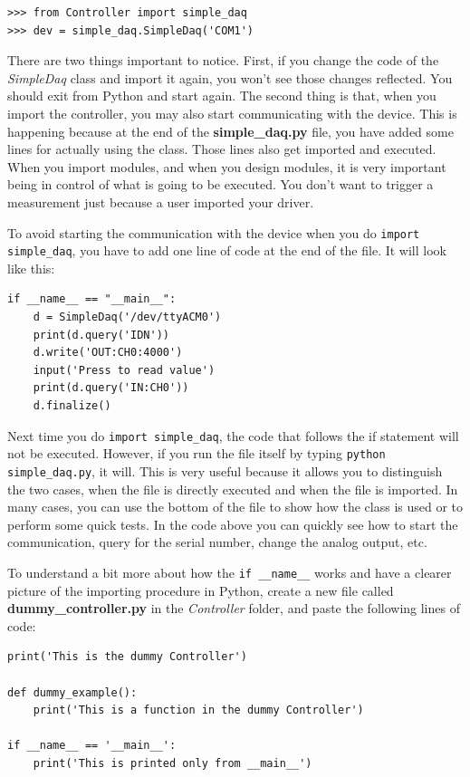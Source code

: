 \begin{verbatim}
>>> from Controller import simple_daq
>>> dev = simple_daq.SimpleDaq('COM1')
\end{verbatim}

There are two things important to notice. First, if you change the code of the \emph{SimpleDaq} class and import it again, you won't see those
changes reflected. You should exit from Python and start again. The second thing is that, when you import the controller, you may also start
communicating with the device. This is happening because at the end of the \textbf{simple\_daq.py} file, you have added some lines for actually using
the class. Those lines also get imported and executed. When you import modules, and when you design modules, it is very important being in control of what is going to be executed. You don't want to trigger a measurement just because a user imported your driver. 

To avoid starting the communication with the device when you do \texttt{import simple_daq}, you have to add one line of code at
the end of the file. It will look like this:

\begin{verbatim}
if __name__ == "__main__":
    d = SimpleDaq('/dev/ttyACM0')
    print(d.query('IDN'))
    d.write('OUT:CH0:4000')
    input('Press to read value')
    print(d.query('IN:CH0'))
    d.finalize()
\end{verbatim}

Next time you do \texttt{import simple_daq}, the code that follows the if statement will not be executed. However, if you run the file itself by typing \texttt{python simple_daq.py}, it will. This is very useful because it allows you to distinguish the two cases, when the file is directly executed and when the file is imported. In many cases, you can use the bottom of the file to show how the class is used or to perform some quick tests. In the code above you can quickly see how to start the communication, query for the serial number, change the analog output, etc.

To understand a bit more about how the \texttt{if __name__} works and have a clearer picture of the importing procedure in Python, create
a new file called \textbf{dummy\_controller.py} in the \emph{Controller} folder, and paste the following lines of code:

\begin{verbatim}
print('This is the dummy Controller')

def dummy_example():
    print('This is a function in the dummy Controller')

if __name__ == '__main__':
    print('This is printed only from __main__')
\end{verbatim}

